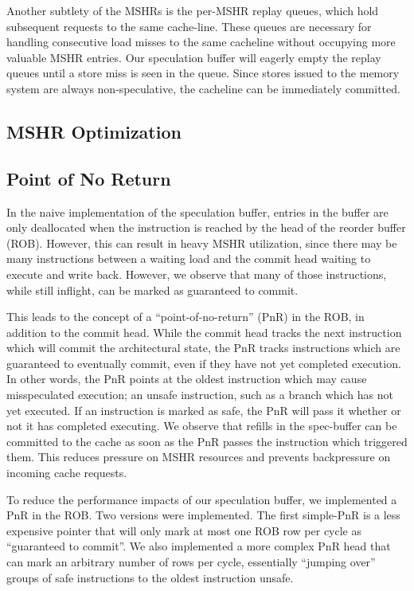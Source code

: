 Another subtlety of the MSHRs is the per-MSHR replay queues, which hold subsequent requests to the same cache-line. These queues are necessary for handling consecutive load misses to the same cacheline without occupying more valuable MSHR entries. Our speculation buffer will eagerly empty the replay queues until a store miss is seen in the queue. Since stores issued to the memory system are always non-speculative, the cacheline can be immediately committed.

\subsection{MSHR Optimization}


\subsection{Point of No Return}
In the naive implementation of the speculation buffer, entries in the buffer are only deallocated when the instruction is reached by the head of the reorder buffer (ROB). However, this can result in heavy MSHR utilization, since there may be many instructions between a waiting load and the commit head waiting to execute and write back. However, we observe that many of those instructions, while still inflight, can be marked as guaranteed to commit.

This leads to the concept of a ``point-of-no-return'' (PnR) in the ROB, in addition to the commit head. While the commit head tracks the next instruction which will commit the architectural state, the PnR tracks instructions which are guaranteed to eventually commit, even if they have not yet completed execution. In other words, the PnR points at the oldest instruction which may cause misspeculated execution; an unsafe instruction, such as a branch which has not yet executed. If an instruction is marked as safe, the PnR will pass it whether or not it has completed executing. We observe that refills in the spec-buffer can be committed to the cache as soon as the PnR passes the instruction which triggered them. This reduces pressure on MSHR resources and prevents backpressure on incoming cache requests.

To reduce the performance impacts of our speculation buffer, we implemented a PnR in the ROB. Two versions were implemented. The first simple-PnR is a less expensive pointer that will only mark at most one ROB row per cycle as ``guaranteed to commit''. We also implemented a more complex PnR head that can mark an arbitrary number of rows per cycle, essentially ``jumping over'' groups of safe instructions to the oldest instruction unsafe.
